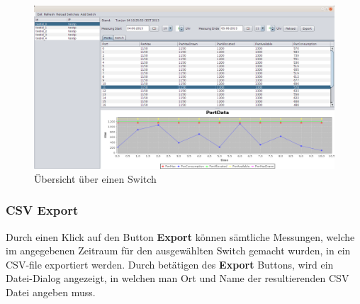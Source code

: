 \begin{figure}[h]
    \centering
    \leavevmode
    \includegraphics[width=1.0\linewidth]{figures/screenshot1}
    \caption{Übersicht über einen Switch}
    \label{fig:overview-port}
\end{figure}

\subsubsection{CSV Export}
Durch einen Klick auf den Button \textbf{Export} können sämtliche Messungen, welche im angegebenen Zeitraum für den ausgewählten Switch gemacht wurden, in ein CSV-file exportiert werden. Durch betätigen des \textbf{Export} Buttons, wird ein Datei-Dialog angezeigt, in welchen man Ort und Name der resultierenden CSV Datei angeben muss.
